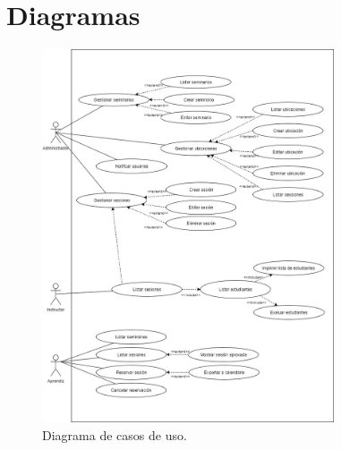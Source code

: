 \chapter{Diagramas}

\begin{figure}[h]
	\begin{center}
		\includegraphics[width=0.77\textwidth]{figuras/diagramaCasosDeUso.jpg}
		\caption{Diagrama de casos de uso.} \label{fig:diagramaCasosDeUso}
	\end{center}
\end{figure}

